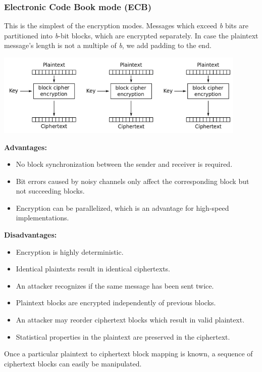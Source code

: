 \documentclass{math}
\begin{document}
\subsubsection*{Electronic Code Book mode (ECB)}
This is the simplest of the encryption modes. Messages which exceed \textit{b}
bits are partitioned into \textit{b}-bit blocks, which are encrypted separately.
In case the plaintext message's length is not a multiple of \textit{b}, we add
padding to the end.
\begin{center}
  \includegraphics[width=12cm]{assets/ecb.png}
\end{center}
\textbf{Advantages:}
\begin{itemize}
  \item No block synchronization between the sender and receiver is required.
  \item Bit errors caused by noisy channels only affect the corresponding block
  but not succeeding blocks.
  \item Encryption can be parallelized, which is an advantage for high-speed
  implementations.
\end{itemize}
\textbf{Disadvantages:}
\begin{itemize}
  \item Encryption is highly deterministic.
  \item Identical plaintexts result in identical ciphertexts.
  \item An attacker recognizes if the same message has been sent twice.
  \item Plaintext blocks are encrypted independently of previous blocks.
  \item An attacker may reorder ciphertext blocks which result in valid
  plaintext.
  \item Statistical properties in the plaintext are preserved in the
  ciphertext.
\end{itemize}
Once a particular plaintext to ciphertext block mapping is known, a sequence of
ciphertext blocks can easily be manipulated.
\end{document}
